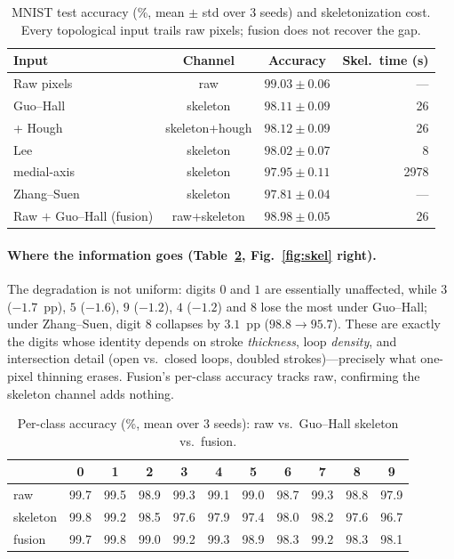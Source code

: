 \documentclass{article}
\begin{document}
\begin{table}[t]
\caption{MNIST test accuracy (\%, mean $\pm$ std over $3$ seeds) and skeletonization cost.
Every topological input trails raw pixels; fusion does not recover the gap.}
\label{tab:overall}
\centering
\begin{tabular}{@{}lccr@{}}
\toprule
Input & Channel & Accuracy & Skel.\ time (s) \\
\midrule
Raw pixels                 & raw            & $\mathbf{99.03 \pm 0.06}$ & --- \\
\midrule
Guo--Hall \cite{GuoHall1989}      & skeleton       & $98.11 \pm 0.09$ & 26 \\
\;\; + Hough \cite{DudaHart1972}  & skeleton+hough & $98.12 \pm 0.09$ & 26 \\
Lee \cite{Lee1994}                & skeleton       & $98.02 \pm 0.07$ & 8 \\
medial-axis                       & skeleton       & $97.95 \pm 0.11$ & 2978 \\
Zhang--Suen \cite{ZhangSuen1984}  & skeleton       & $97.81 \pm 0.04$ & --- \\
\midrule
Raw $+$ Guo--Hall (fusion) & raw+skeleton   & $98.98 \pm 0.05$ & 26 \\
\bottomrule
\end{tabular}
\end{table}

\paragraph{Where the information goes (Table~\ref{tab:perclass}, Fig.~\ref{fig:skel} right).}
The degradation is not uniform: digits $0$ and $1$ are essentially unaffected, while $3$
($-1.7$~pp), $5$ ($-1.6$), $9$ ($-1.2$), $4$ ($-1.2$) and $8$ lose the most under Guo--Hall;
under Zhang--Suen, digit $8$ collapses by $3.1$~pp ($98.8\to95.7$). These are exactly the digits
whose identity depends on stroke \emph{thickness}, loop \emph{density}, and intersection detail
(open vs.\ closed loops, doubled strokes)---precisely what one-pixel thinning erases. Fusion's
per-class accuracy tracks raw, confirming the skeleton channel adds nothing.

\begin{table}[t]
\caption{Per-class accuracy (\%, mean over $3$ seeds): raw vs.\ Guo--Hall skeleton vs.\ fusion.}
\label{tab:perclass}
\centering
\small
\begin{tabular}{@{}lcccccccccc@{}}
\toprule
 & 0 & 1 & 2 & 3 & 4 & 5 & 6 & 7 & 8 & 9 \\
\midrule
raw       & 99.7 & 99.5 & 98.9 & 99.3 & 99.1 & 99.0 & 98.7 & 99.3 & 98.8 & 97.9 \\
skeleton  & 99.8 & 99.2 & 98.5 & 97.6 & 97.9 & 97.4 & 98.0 & 98.2 & 97.6 & 96.7 \\
fusion    & 99.7 & 99.8 & 99.0 & 99.2 & 99.3 & 98.9 & 98.3 & 99.2 & 98.3 & 98.1 \\
\bottomrule
\end{tabular}
\end{table}
\end{document}
